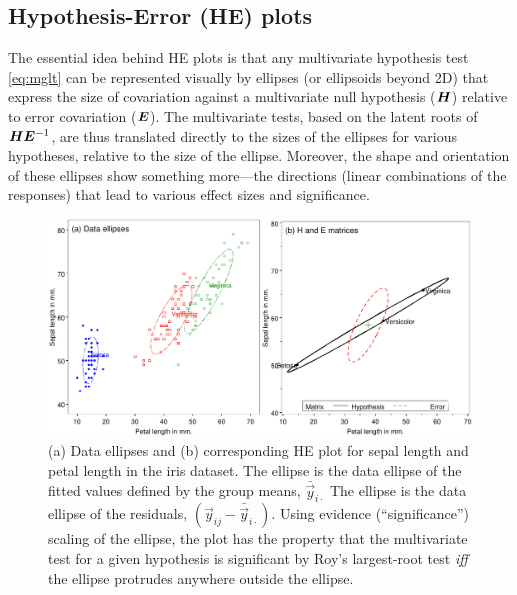 \subsection{Hypothesis-Error (HE) plots}

The essential idea behind HE plots is that any multivariate hypothesis
test \eqref{eq:mglt} can be represented visually by ellipses (or ellipsoids beyond 2D) that express
the size  of covariation against a multivariate null hypothesis
($\bm{H}$) relative to error covariation ($\bm{E}$).
The multivariate tests, based on the latent roots of $\bm{H} \bm{E}^{-1}$,
are thus translated directly to the sizes of the  ellipses for
various hypotheses, relative to the size of the  ellipse.
Moreover, the shape and orientation of these ellipses show something more---the
directions (linear combinations of the responses) that lead to
various effect sizes and significance.

\begin{figure}[htb]
  \centering
  \includegraphics[width=.9\textwidth,clip]{fig/heplot3a}
  \caption{(a) Data ellipses and (b) corresponding HE plot for sepal length and petal length in the iris dataset.
  	The  ellipse is the data ellipse of the fitted values defined by the group means, $\bar{\vec{y}}_{i \cdot}$
  	The  ellipse is the data ellipse of the residuals, $(\vec{y}_{ij} - \bar{\vec{y}}_{i \cdot})$.
  	Using evidence (``significance'') scaling of the  ellipse, the plot has the property that
  	the multivariate test for a given hypothesis is significant by Roy's largest-root test \emph{iff}
  	the  ellipse protrudes anywhere outside the  ellipse.}%
  \label{fig:heplot3a}
\end{figure}

